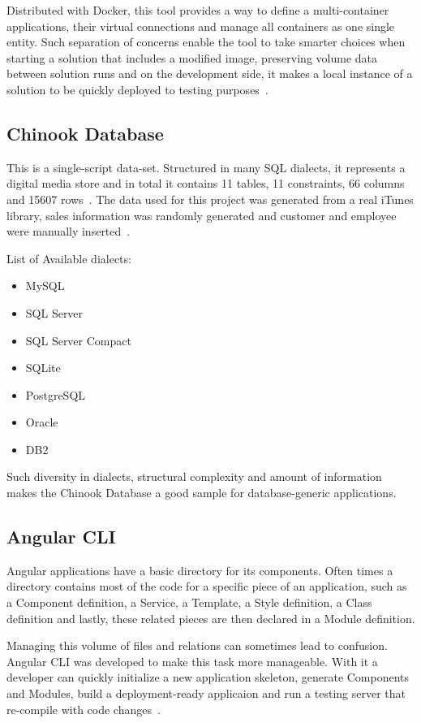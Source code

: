 Distributed with Docker, this tool provides a way to define a multi-container applications, their virtual connections and manage all containers as one single entity. Such separation of concerns enable the tool to take smarter choices when starting a solution that includes a modified image, preserving volume data between solution runs and on the development side, it makes a local instance of a solution to be quickly deployed to testing purposes~\cite{compose}. 

\subsection{Chinook Database}
This is a single-script data-set. Structured in many \gls{SQL} dialects, it represents a  digital media store and in total it contains 11 tables, 11 constraints, 66 columns and 15607 rows~\cite{schemaspy}. The data used for this project was generated from a real iTunes library, sales information was randomly generated and customer and employee were manually inserted~\cite{chinook}.

List of Available dialects:
\begin{itemize}
\item MySQL
\item SQL Server
\item SQL Server Compact
\item SQLite
\item PostgreSQL
\item Oracle
\item DB2
\end{itemize}

Such diversity in dialects, structural complexity and amount of information makes the Chinook Database a good sample for database-generic applications.

\subsection{Angular CLI}\label{angularcli}
Angular applications have a basic directory for its components. Often times a directory contains most of the code for a specific piece of an application, such as a Component definition, a Service, a Template, a Style definition, a Class definition and lastly, these related pieces are then declared in a Module definition.

Managing this volume of files and relations can sometimes lead to confusion. Angular \gls{CLI} was developed to make this task more manageable. With it a developer can quickly initialize a new application skeleton, generate Components and Modules, build a deployment-ready applicaion and run a testing server that re-compile with code changes~\cite{angularcli}.

